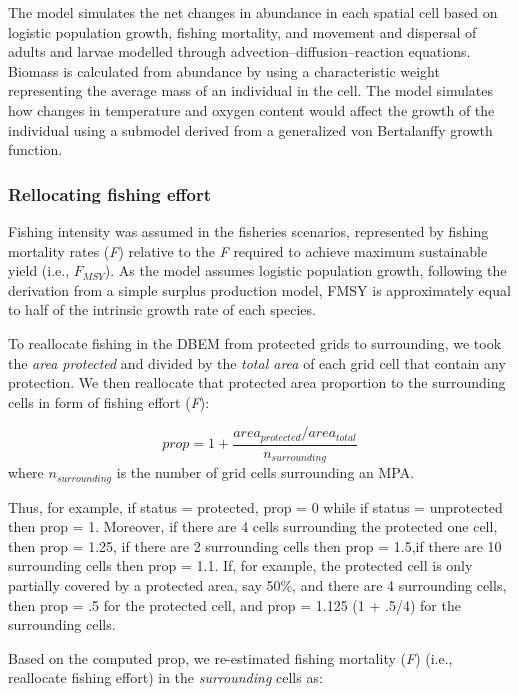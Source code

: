 \documentclass[
]{article}
\begin{document}
The model simulates the net changes in abundance in each spatial cell based on logistic population growth, fishing mortality, and movement and dispersal of adults and larvae modelled through advection--diffusion--reaction equations. Biomass is calculated from abundance by using a characteristic weight representing the average mass of an individual in the cell. The model simulates how changes in temperature and oxygen content would affect the growth of the individual using a submodel derived from a generalized von Bertalanffy growth function.

\hypertarget{rellocating-fishing-effort-1}{%
\subsubsection{Rellocating fishing effort}\label{rellocating-fishing-effort-1}}

Fishing intensity was assumed in the fisheries scenarios, represented by fishing mortality rates (\emph{F}) relative to the \emph{F} required to achieve maximum sustainable yield (i.e., \(F_{MSY}\)). As the model assumes logistic population growth, following the derivation from a simple surplus production model, FMSY is approximately equal to half of the intrinsic growth rate of each species.

To reallocate fishing in the DBEM from protected grids to surrounding, we took the \emph{area protected} and divided by the \emph{total area} of each grid cell that contain any protection. We then reallocate that protected area proportion to the surrounding cells in form of fishing effort (\emph{F}):

\[prop = 1 + \frac{area_{protected}/area_{total}}{n_{surrounding}}\]
where \(n_{surrounding}\) is the number of grid cells surrounding an MPA.

Thus, for example, if status = protected, prop = 0 while if status = unprotected then prop = 1. Moreover, if there are 4 cells surrounding the protected one cell, then prop = 1.25, if there are 2 surrounding cells then prop = 1.5,if there are 10 surrounding cells then prop = 1.1. If, for example, the protected cell is only partially covered by a protected area, say 50\%, and there are 4 surrounding cells, then prop = .5 for the protected cell, and prop = 1.125 (1 + .5/4) for the surrounding cells.

Based on the computed prop, we re-estimated fishing mortality (\emph{F}) (i.e., reallocate fishing effort) in the \emph{surrounding} cells as:
\end{document}
